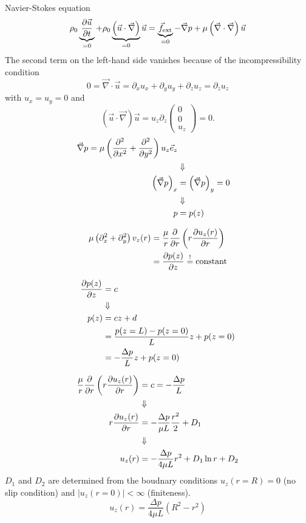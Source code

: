 Navier-Stokes equation
\begin{equation}
\rho_0\underbrace{\frac{\partial \vec{u}}{\partial t}}_{=0}+\rho_0\underbrace{\left(\vec{u}\cdot\vec{\nabla}\right)}_{=0}\vec{u} = \underbrace{\vec{f}_\mathrm{ext}}_{=0}-\vec{\nabla}p+\mu\left(\vec{\nabla}\cdot\vec{\nabla}\right)\vec{u}
\end{equation}
The second term on the left-hand side vanishes because of the incompressibility condition
\begin{equation}
0=\vec{\nabla}\cdot\vec{u}=\partial_xu_x+\partial_yu_y+\partial_zu_z = \partial_zu_z
\end{equation}
with $u_x=u_y=0$ and
\begin{equation}
\left(\vec{u}\cdot\vec{\nabla}\right)\vec{u} = u_z\partial_z
\begin{pmatrix}
0\\0\\u_z
\end{pmatrix} = 0.
\end{equation}
\begin{align}
\vec{\nabla}p = \mu\left(\frac{\partial^2 }{\partial x^2}+\frac{\partial^2 }{\partial y^2}\right)u_z\vec{e}_z\\
&\Downarrow\notag\\
\left(\vec{\nabla}p\right)_x &= \left(\vec{\nabla}p\right)_y = 0 \\
&\Downarrow\notag\\
p &= p(z)
\end{align}

\begin{align}
\mu\left(\partial_x^2+\partial_y^2\right) v_z(r) &= \frac{\mu}{r}\frac{\partial }{\partial r}\left(r\frac{\partial u_z(r)}{\partial r}\right) \\
&= \frac{\partial p(z)}{\partial z} \overset{!}{=} \mathrm{constant}
\end{align}

\begin{align}
\frac{\partial p(z)}{\partial z}&=c \\
&\Downarrow\notag\\
p(z) &= cz+d \\
&= \frac{p(z=L)-p(z=0)}{L}z+p(z=0)\\
&= -\frac{\Delta p}{L}z + p(z=0)
\end{align}

\begin{align}
\frac{\mu}{r}\frac{\partial }{\partial r}\left(r\frac{\partial u_z(r)}{\partial r}\right) &= c = -\frac{\Delta p}{L} \\
&\Downarrow\notag\\
r\frac{\partial u_z(r)}{\partial r} &= -\frac{\Delta p}{\mu L}\frac{r^2}{2} + D_1 \\
&\Downarrow\notag\\
u_z(r) &= -\frac{\Delta p}{4\mu L}r^2 + D_1 \ln r + D_ 2 \\
\end{align}
$D_1$ and $D_2$ are determined from the boudnary conditions $u_z(r=R)=0$ (no slip condition) and $|u_z(r=0)|<\infty$ (finiteness).
\begin{equation}
u_z(r) = \frac{\Delta p}{4\mu L}\left( R^2 - r^2\right)
\end{equation}

